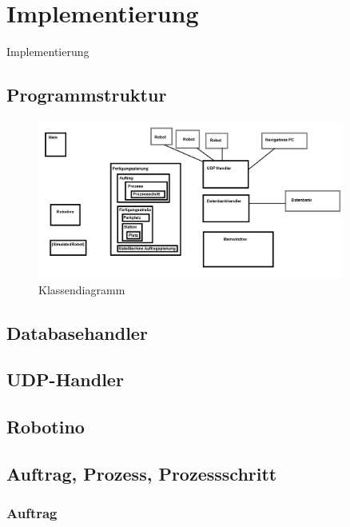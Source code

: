 
\chapter{Implementierung}
\label{sec:Implementierung}

Implementierung

\section{Programmstruktur}

\begin{figure}[htb]
    \centering
    \includegraphics[width=0.9\textwidth]{Abbildungen/Klassendiagramm.PNG}
    \caption{Klassendiagramm}		
    \label{fig:Klassendiagramm}
\end{figure}



\section{Databasehandler}
\section{UDP-Handler} 
\label{sec:UdpHandler}
\section{Robotino} 



\section{Auftrag, Prozess, Prozessschritt} 
\label{sec:AuftragProzessSchritt}
\subsection{Auftrag}
\label{sec:Auftrag}
